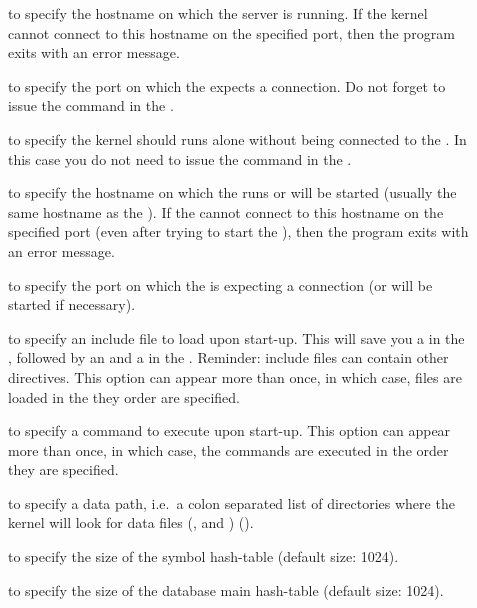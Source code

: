 \begin{description}

\item[] to specify the hostname on which the server is running.  If
the kernel cannot connect to this hostname on the specified port, then the
program exits with an error message.

\item[] to specify the port on which the \OPRSS{} expects a
connection. Do not forget to issue the  command in the
\OPRSS{}.

\item[] to specify the kernel should runs alone without being
connected to the \OPRSS{}. In this case you do not need to issue the
 command in the \OPRSS{}.

\item[] to specify the hostname on which the \MPA{} runs or will be
started (usually the same hostname as the \OPRSS{}). If the \CPK{}
cannot connect to this hostname on the specified port (even after trying to
start the \MPA{}), then the program exits with an error message.

\item[] to specify the port on which the \MPA{} is expecting a
connection (or will be started if necessary).

\item[] to specify an include file to load upon start-up. This will
  save you a  in the \OPRSS{}, followed by an 
  and a  in the \CPK{}. Reminder: include files can contain
  other  directives. This option can appear more than once, in
  which case, files are loaded in the they order are specified.
  
\item[] to specify a command to execute upon start-up. This option
  can appear more than once, in which case, the commands are executed in the
  order they are specified.

\item[] to specify a data path, i.e.\ a colon separated list of
directories where the kernel will look for data files (,
 and ) ().

\item[] to specify the size of the symbol hash-table (default size:
1024).

\item[] to specify the size of the database main hash-table
(default size: 1024).


\end{description}
